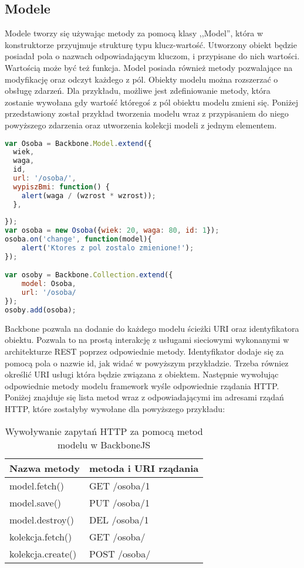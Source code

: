\subsection{Modele}
Modele tworzy się używając metody za pomocą klasy ,,Model'', która w konstruktorze przyujmuje strukturę typu klucz-wartość. Utworzony obiekt będzie posiadał pola o nazwach odpowiadającym kluczom, i przypisane do nich wartości. Wartością może być też funkcja. 
Model posiada również metody pozwalające na modyfikację oraz odczyt każdego z pól. Obiekty modelu można rozszerzać o obsługę zdarzeń. Dla przykładu, możliwe jest zdefiniowanie metody, która zostanie wywołana gdy wartość któregoś z pól obiektu modelu zmieni się. 
Poniżej przedstawiony został przykład tworzenia modelu wraz z przypisaniem do niego powyższego zdarzenia oraz utworzenia kolekcji modeli z jednym elementem.
\begin{lstlisting}[language=JavaScript]
var Osoba = Backbone.Model.extend({
  wiek,
  waga,
  id,
  url: '/osoba/',
  wypiszBmi: function() {
  	alert(waga / (wzrost * wzrost));
  },
  
});
var osoba = new Osoba({wiek: 20, waga: 80, id: 1});
osoba.on('change', function(model){
	alert('Ktores z pol zostalo zmienione!');
});

var osoby = Backbone.Collection.extend({
	model: Osoba,
	url: '/osoba/
});
osoby.add(osoba);
\end{lstlisting}

Backbone pozwala na dodanie do każdego modelu ścieżki URI oraz identyfikatora obiektu. Pozwala to na prostą interakcję z usługami sieciowymi wykonanymi w architekturze REST poprzez odpowiednie metody. Identyfikator dodaje się za pomocą pola o nazwie id, jak widać w powyższym przykładzie. Trzeba równiez określić URI usługi która będzie związana z obiektem. Następnie wywołując odpowiednie metody modelu framework wyśle odpowiednie rządania HTTP. Poniżej znajduje się lista metod wraz z odpowiadającymi im adresami rządań HTTP, które zostałyby wywołane dla powyższego przykładu:

\begin{table}[h]
	\caption{Wywoływanie zapytań HTTP za pomocą metod modelu w BackboneJS}
	\label{tab:heading-styles}
	\begin{tabularx}{\textwidth}{|X|X|}
		\hline
		Nazwa metody 						& metoda i URI rządania 	\\ 
		\hline
		model.fetch()		 				& GET /osoba/1 	\\ 
		\hline
		model.save()						& PUT /osoba/1  \\ 
		\hline
		model.destroy() 					& DEL /osoba/1 \\ 
		\hline
		kolekcja.fetch()					& GET /osoba/  \\ 
		\hline
		kolekcja.create() 					& POST /osoba/ \\ 
		\hline
	\end{tabularx}
\end{table}


